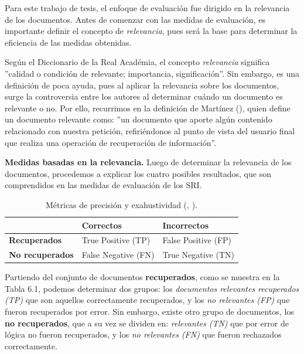 Para este trabajo de tesis, el enfoque de evaluación fue dirigido en la relevancia de los documentos.
Antes de comenzar con las medidas de evaluación, es importante definir el concepto de \textit{relevancia}, pues será la base para determinar la eficiencia de las medidas obtenidas. 

Según el Diccionario de la Real Académia, el concepto \textit{relevancia} significa ''calidad o condición de relevante; importancia, significación''. Sin embargo, es una definición de poca ayuda, pues al aplicar la relevancia sobre los documentos, surge la controversia entre los autores al determinar cuándo un documento es relevante o no. Por ello, recurrimos en la definición de Martínez (\citeyear{book_RI}), quien define un documento relevante como: ''un documento que aporte algún contenido relacionado con nuestra petición, refiriéndonos al punto de vista del usuario final que realiza una operación de recuperación de información''. 

\textbf{Medidas basadas en la relevancia.} Luego de determinar la relevancia de los documentos, procedemos a explicar los cuatro posibles resultados, que son comprendidos en las medidas de evaluación de los SRI.

\begin{table}[H]
    \centering
    \begin{tabular}{|p{4cm} p{4cm} p{4cm}|}
    \hline
 	 & \textbf{Correctos} & \textbf{Incorrectos} \\
    \hline \hline
    \textbf{Recuperados} & True Positive (TP) & False Positive (FP)\\
    \hline
\textbf{No recuperados} & False Negative (FN) & True Negative (TN)\\
    \hline
    \end{tabular}
\caption[Métricas de precisión y exahustividad]{Métricas de precisión y exahustividad (\citeauthor{tesis_evaluacion}, \citeyear{tesis_evaluacion}).}
\label{tabla:metricas de evaluacion}
\end{table}

Partiendo del conjunto de documentos \textbf{recuperados}, como se muestra en la Tabla 6.1, podemos determinar dos grupos: los \textit{documentos relevantes recuperados (TP)} que son aquellos correctamente recuperados, y los \textit{no relevantes (FP)} que fueron recuperados por error. Sin embargo, existe otro grupo de documentos, los \textbf{no recuperados}, que a su vez se dividen en: \textit{relevantes (TN)} que por error de lógica no fueron recuperados, y los \textit{no relevantes (FN)} que fueron rechazados correctamente.

